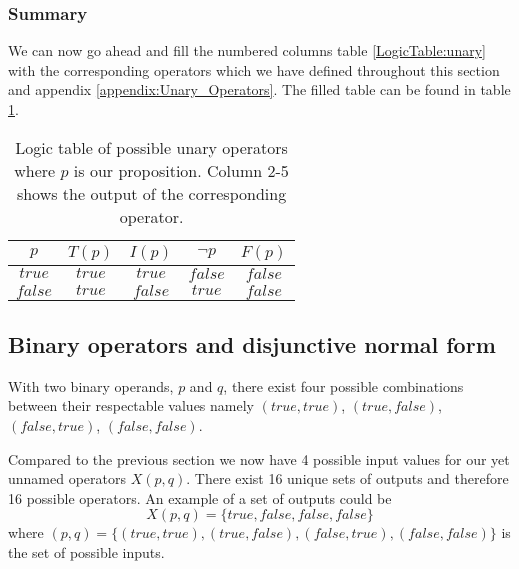             \subsubsection{Summary}
                
                We can now go ahead and fill the numbered columns table \ref{LogicTable:unary} with the corresponding operators which we have defined throughout this section and appendix \ref{appendix:Unary_Operators}. The filled table can be found in table \ref{LogicTable:unaryfilled}. 
                
                \begin{table}[h!]
                    \centering
                    \begin{tabular}{|c||c|c|c|c|}
                    	\hline
                    	  $p$   & $T(p)$ & $I(p)$  & $\neg p$ & $F(p)$  \\ \hline
                    	$true$  & $true$ & $true$  & $false$  & $false$ \\ \hline
                    	$false$ & $true$ & $false$ &  $true$  & $false$ \\ \hline
                    \end{tabular}
                    \caption{Logic table of possible unary operators where $p$ is our proposition. Column 2-5 shows the output of the corresponding operator.}
                    \label{LogicTable:unaryfilled}
                \end{table} 
                
                 
\newpage        
        \subsection{Binary operators and disjunctive normal form}
        
            With two binary operands, $p$ and $q$, there exist four possible combinations between their respectable values namely $(true, true)$, $(true, false)$, $(false, true)$, $(false, false)$.
            
            Compared to the previous section we now have 4 possible input values for our yet unnamed operators $X(p, q)$. There exist 16 unique sets of outputs and therefore 16 possible operators. An example of a set of outputs could be 
            \begin{equation}
                X(p, q) =\{true, false, false, false\}
            \end{equation}
            where $(p, q) = \{(true, true), (true, false), (false, true), (false, false)\}$ is the set of possible inputs. 
            
